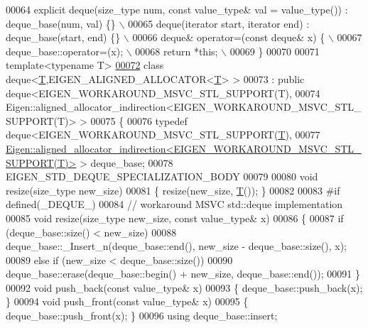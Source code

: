 \begin{DoxyCode}
00064 \textcolor{preprocessor}{    explicit deque(size\_type num, const value\_type& val = value\_type()) : deque\_base(num, val) \{\} \(\backslash\)}
00065 \textcolor{preprocessor}{    deque(iterator start, iterator end) : deque\_base(start, end) \{\}  \(\backslash\)}
00066 \textcolor{preprocessor}{    deque& operator=(const deque& x) \{  \(\backslash\)}
00067 \textcolor{preprocessor}{      deque\_base::operator=(x);  \(\backslash\)}
00068 \textcolor{preprocessor}{      return *this;  \(\backslash\)}
00069 \textcolor{preprocessor}{    \}}
00070 
00071   \textcolor{keyword}{template}<\textcolor{keyword}{typename} T>
\hyperlink{classstd_1_1deque_3_01_t_00_01_e_i_g_e_n___a_l_i_g_n_e_d___a_l_l_o_c_a_t_o_r_3_01_t_01_4_01_4}{00072}   \textcolor{keyword}{class }deque<\hyperlink{group___sparse_core___module}{T},EIGEN\_ALIGNED\_ALLOCATOR<\hyperlink{group___sparse_core___module}{T}> >
00073     : \textcolor{keyword}{public} deque<EIGEN\_WORKAROUND\_MSVC\_STL\_SUPPORT(T),
00074                    Eigen::aligned\_allocator\_indirection<EIGEN\_WORKAROUND\_MSVC\_STL\_SUPPORT(T)> >
00075 \{
00076   \textcolor{keyword}{typedef} deque<EIGEN\_WORKAROUND\_MSVC\_STL\_SUPPORT(\hyperlink{group___sparse_core___module}{T}),
00077                 
      \hyperlink{class_eigen_1_1aligned__allocator__indirection}{Eigen::aligned\_allocator\_indirection<EIGEN\_WORKAROUND\_MSVC\_STL\_SUPPORT(T)>}
       > deque\_base;
00078   EIGEN\_STD\_DEQUE\_SPECIALIZATION\_BODY
00079 
00080   \textcolor{keywordtype}{void} resize(size\_type new\_size)
00081   \{ resize(new\_size, \hyperlink{group___sparse_core___module}{T}()); \}
00082 
00083 \textcolor{preprocessor}{#if defined(\_DEQUE\_)}
00084   \textcolor{comment}{// workaround MSVC std::deque implementation}
00085   \textcolor{keywordtype}{void} resize(size\_type new\_size, \textcolor{keyword}{const} value\_type& x)
00086   \{
00087     \textcolor{keywordflow}{if} (deque\_base::size() < new\_size)
00088       deque\_base::\_Insert\_n(deque\_base::end(), new\_size - deque\_base::size(), x);
00089     \textcolor{keywordflow}{else} \textcolor{keywordflow}{if} (new\_size < deque\_base::size())
00090       deque\_base::erase(deque\_base::begin() + new\_size, deque\_base::end());
00091   \}
00092   \textcolor{keywordtype}{void} push\_back(\textcolor{keyword}{const} value\_type& x)
00093   \{ deque\_base::push\_back(x); \} 
00094   \textcolor{keywordtype}{void} push\_front(\textcolor{keyword}{const} value\_type& x)
00095   \{ deque\_base::push\_front(x); \}
00096   \textcolor{keyword}{using} deque\_base::insert;  

\end{DoxyCode}
